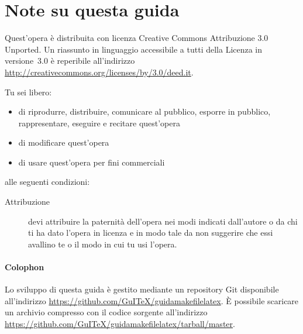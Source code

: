 \newpage{}
{}
\chapter*{Note su questa guida}
\label{cha:note-guida}

Quest'opera è distribuita con licenza Creative Commons Attribuzione 3.0
Unported.  Un riassunto in linguaggio accessibile a tutti della Licenza in
versione~3.0 è reperibile all'indirizzo
\url{http://creativecommons.org/licenses/by/3.0/deed.it}.

Tu sei libero:
\begin{itemize}
\item di riprodurre, distribuire, comunicare al pubblico, esporre in pubblico,
  rappresentare, eseguire e recitare quest'opera
\item di modificare quest'opera
\item di usare quest'opera per fini commerciali
\end{itemize}
alle seguenti condizioni:
\begin{description}
\item[Attribuzione] devi attribuire la paternità dell'opera nei modi indicati
  dall'autore o da chi ti ha dato l'opera in licenza e in modo tale da non
  suggerire che essi avallino te o il modo in cui tu usi l'opera.
\end{description}

\vfill{}
\subsubsection{Colophon}
\label{sec:colophon}

Lo sviluppo di questa guida è gestito mediante un repository Git disponibile
all'indirizzo
\url{https://github.com/GuITeX/guidamakefilelatex}.
È possibile scaricare un archivio compresso con il codice sorgente all'indirizzo
\url{https://github.com/GuITeX/guidamakefilelatex/tarball/master}.

